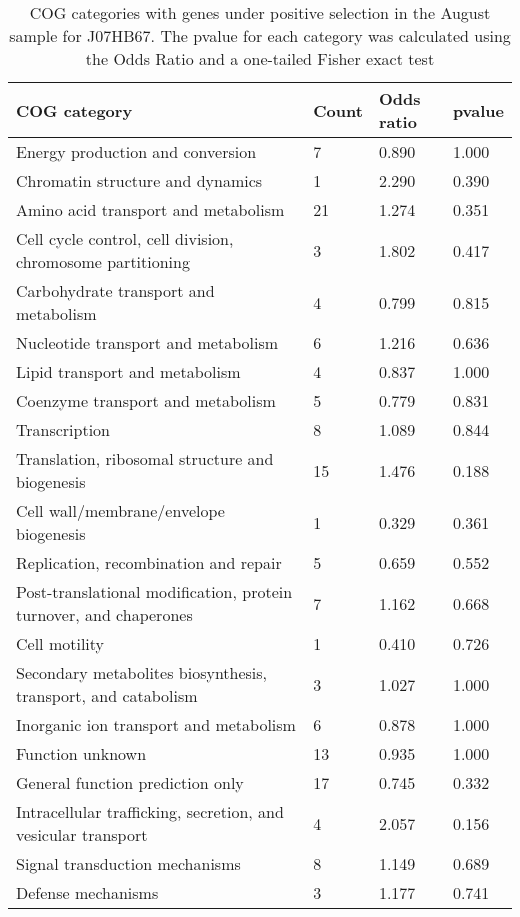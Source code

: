 \begin{table}[hb]
\footnotesize 
	\tabcolsep=0.11cm 
\caption{COG categories with genes under positive selection in the August sample for J07HB67. The pvalue for each category was calculated using the Odds Ratio and a one-tailed Fisher exact test} 
\begin{tabularx}{\textwidth}{L{6cm}R{2cm}R{2cm}R{2cm}} 
\hline 
\textbf{COG category} & \textbf{Count} & \textbf{Odds ratio} & \textbf{pvalue} \\ 
\hline 
Energy production and conversion & 7 & 0.890 & 1.000 \\ 
Chromatin structure and dynamics & 1 & 2.290 & 0.390 \\ 
Amino acid transport and metabolism & 21 & 1.274 & 0.351 \\ 
Cell cycle control, cell division, chromosome partitioning & 3 & 1.802 & 0.417 \\ 
Carbohydrate transport and metabolism & 4 & 0.799 & 0.815 \\ 
Nucleotide transport and metabolism & 6 & 1.216 & 0.636 \\ 
Lipid transport and metabolism & 4 & 0.837 & 1.000 \\ 
Coenzyme transport and metabolism & 5 & 0.779 & 0.831 \\ 
Transcription & 8 & 1.089 & 0.844 \\ 
Translation, ribosomal structure and biogenesis & 15 & 1.476 & 0.188 \\ 
Cell wall/membrane/envelope biogenesis & 1 & 0.329 & 0.361 \\ 
Replication, recombination and repair & 5 & 0.659 & 0.552 \\ 
Post-translational modification, protein turnover, and chaperones & 7 & 1.162 & 0.668 \\ 
Cell motility & 1 & 0.410 & 0.726 \\ 
Secondary metabolites biosynthesis, transport, and catabolism & 3 & 1.027 & 1.000 \\ 
Inorganic ion transport and metabolism & 6 & 0.878 & 1.000 \\ 
Function unknown & 13 & 0.935 & 1.000 \\ 
General function prediction only & 17 & 0.745 & 0.332 \\ 
Intracellular trafficking, secretion, and vesicular transport & 4 & 2.057 & 0.156 \\ 
Signal transduction mechanisms & 8 & 1.149 & 0.689 \\ 
Defense mechanisms & 3 & 1.177 & 0.741 \\ 
\end{tabularx} 
\label{August_COG_Selection_J07HB67} 
 \end{table} 

